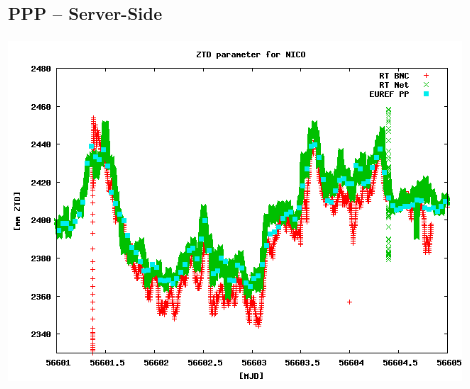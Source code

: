 \documentclass[10pt]{beamer}
\begin{document}

\begin{frame}
\frametitle{PPP -- Server-Side}
  \begin{center}
    \includegraphics[width=0.9\textwidth,angle=0]{tropo3.png}
  \end{center}
\end{frame}

\end{document}
